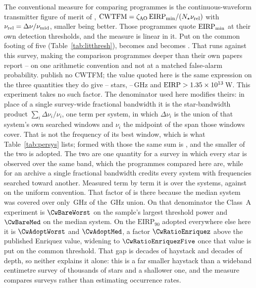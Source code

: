 The conventional measure for comparing programmes is the continuous-waveform
transmitter figure of merit of \citet{Enriquez2017},
$\mathrm{CWTFM}=\zeta_{\rm AO}\,\mathrm{EIRP}_{\rm min}/
(N_{\star}\nu_{\rm rel})$ with $\nu_{\rm rel}=\Delta\nu/\nu_{\rm mid}$,
smaller being better. Those programmes quote $\mathrm{EIRP}_{\rm min}$ at their own detection
thresholds, and the measure is linear in it. Put on the common footing of
five (Table~\ref{tab:litthresh}), \FomLitEnriquez{} becomes
\FomLitEnriquezFive{} and \FgLitMargot{} becomes \FgLitMargotFive. That runs
against this survey, making the comparison programmes deeper than their own
papers report -- on one arithmetic convention and not
at a matched false-alarm probability. \citet{Margot2023} publish no
CWTFM; the value quoted here is the same expression on the three quantities
they do give -- \FomMargotN{} stars, \FomMargotLo--\FomMargotHi\,GHz and
$\mathrm{EIRP}>1.35\times10^{13}$\,W. This experiment takes no such factor. The
denominator used here modifies theirs: in place of a single survey-wide
fractional bandwidth it is the star-bandwidth product
$\sum_{i}\Delta\nu_{i}/\nu_{i}$, one term per system, in which
$\Delta\nu_{i}$ is the union of that system's own searched windows and
$\nu_{i}$ the midpoint of the span those windows cover. That is not the frequency of its best window, which is
what Table~\ref{tab:persys} lists; formed with those the same sum is
\CwSigmaBest, and the smaller of the two is adopted. The two are one quantity
for a survey in which every star is observed over the same band, which the
programmes compared here are, while for an archive a single fractional
bandwidth credits every system with frequencies searched toward another. Measured term by term it is \CwSigma{} over the \CwNSys{} systems, against
\CwUniform{} on the uniform convention. That factor of \CwRatio{} is there
because the median system was covered over only \SysUnionAMed\,GHz of the
\CvUnionA\,GHz union. On that denominator the Class~A experiment is
$\CwBareWorst$ on the sample's largest threshold power and $\CwBareMed$ on
the median system. On the $\mathrm{EIRP}_{90}$ adopted everywhere else here
it is $\CwAdoptWorst$ and $\CwAdoptMed$, a factor $\CwRatioEnriquez$ above
the published Enriquez value, widening to $\CwRatioEnriquezFive$ once that
value is put on the common threshold. That
gap is \CwBandDex{} decades of haystack and \CwEirpDex{} decades of depth, so
neither explains it alone: this is a far smaller haystack than a wideband
centimetre survey of thousands of stars and a shallower one, and the measure
compares surveys rather than estimating occurrence rates.

